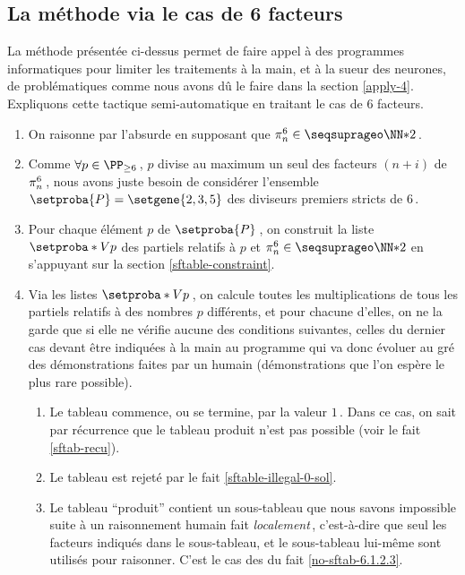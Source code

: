 \subsection{La méthode via le cas de 6 facteurs} \label{apply-6}

\leavevmode
\smallskip

La méthode présentée ci-dessus permet de faire appel à des programmes informatiques pour limiter les traitements à la main, et à la sueur des neurones, de \sftab[x] problématiques comme nous avons dû le faire dans la section \ref{apply-4}.
Expliquons cette tactique semi-automatique en traitant le cas de $6$ facteurs.

\begin{enumerate}
	\item On raisonne par l'absurde en supposant que $\consprod<6> \in \NNssquare$\,.


	\item Comme $\forall p \in \PP_{\geq 6}$\,, $p$ divise au maximum un seul des facteurs $(n + i)$ de $\consprod<6>$\,,
	nous avons juste besoin de considérer l'ensemble $\setproba{P} = \setgene{2, 3, 5}$ des diviseurs premiers stricts de $6$\,.


	\item Pour chaque élément $p$ de $\setproba{P}$\,, on construit la liste $\setproba*{V}{p}$ des \sftab[x] partiels relatifs à $p$ et $\consprod<6> \in \NNssquare$ en s'appuyant sur la section \ref{sftable-constraint}.


	\item Via les listes $\setproba*{V}{p}$\,, on calcule toutes les multiplications de tous les \sftab[x] partiels relatifs à des nombres $p$ différents, et pour chacune d'elles, on ne la garde que si elle ne vérifie aucune des conditions suivantes, celles du dernier cas devant être indiquées à la main au programme qui va donc évoluer au gré des démonstrations faites par un humain (démonstrations que l'on espère le plus rare possible).
	\begin{enumerate}
		\item Le tableau commence, ou se termine, par la valeur $1$\,. Dans ce cas, on sait par récurrence que le tableau produit n'est pas possible (voir le fait \ref{sftab-recu}).

		\item Le tableau est rejeté par le fait \ref{sftable-illegal-0-sol}.

		\item Le tableau \enquote{produit} contient un sous-tableau que nous savons impossible suite à un raisonnement humain fait \emph{localement}\,, c'est-à-dire que seul les facteurs indiqués dans le sous-tableau, et le sous-tableau lui-même sont utilisés pour raisonner.
		C'est le cas des \sftab[x] du fait \ref{no-sftab-6.1.2.3}.
	\end{enumerate}
\end{enumerate}


